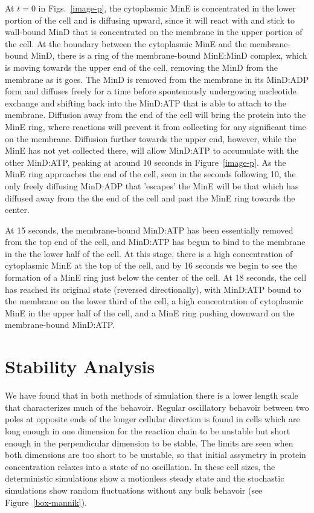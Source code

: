 \documentclass[letterpaper,twocolumn,amsmath,amssymb,pre]{revtex4-1}
\begin{document}
At $t=0$ in Figs.~\ref{image-p}, the cytoplasmic MinE is concentrated
in the lower portion of the cell and is diffusing upward, since it
will react with and stick to wall-bound MinD that is concentrated on
the membrane in the upper portion of the cell.  At the boundary
between the cytoplasmic MinE and the membrane-bound MinD, there is a
ring of the membrane-bound MinE:MinD complex, which is moving towards
the upper end of the cell, removing the MinD from the membrane as it
goes.  The MinD is removed from the membrane in its MinD:ADP form and
diffuses freely for a time before spontenously undergowing nucleotide
exchange and shifting back into the MinD:ATP that is able to attach to
the membrane.  Diffusion away from the end of the cell will bring the
protein into the MinE ring, where reactions will prevent it from
collecting for any significant time on the membrane.  Diffusion
further towards the upper end, however, while the MinE has not yet
collected there, will allow MinD:ATP to accumulate with the other
MinD:ATP, peaking at around 10 seconds in Figure~\ref{image-p}.  As
the MinE ring approaches the end of the cell, seen in the seconds
following 10, the only freely diffusing MinD:ADP that 'escapes' the
MinE will be that which has diffused away from the the end of the cell
and past the MinE ring towards the center.

At 15 seconds, the membrane-bound MinD:ATP has been essentially
removed from the top end of the cell, and MinD:ATP has begun to bind
to the membrane in the the lower half of the cell.  At this stage,
there is a high concentration of cytoplasmic MinE at the top of the
cell, and by 16 seconds we begin to see the formation of a MinE ring
just below the center of the cell.  At 18 seconds, the cell has
reached its original state (reversed directionally), with MinD:ATP
bound to the membrane on the lower third of the cell, a high
concentration of cytoplasmic MinE in the upper half of the cell, and a
MinE ring pushing downward on the membrane-bound MinD:ATP.

\section{Stability Analysis}
\label{sec:stability-analysis}
We have found that in both methods of simulation there is a lower
length scale that characterizes much of the behavoir.  Regular
oscillatory behavoir between two poles at opposite ends of the longer
cellular direction is found in cells which are long enough in one
dimension for the reaction chain to be unstable but short enough in
the perpendicular dimension to be stable.  The limits are seen when
both dimensions are too short to be unstable, so that initial
assymetry in protein concentration relaxes into a state of no
oscillation.  In these cell sizes, the deterministic simulations show
a motionless steady state and the stochastic simulations show random
fluctuations without any bulk behavoir (see Figure~\ref{box-mannik}).
\end{document}
